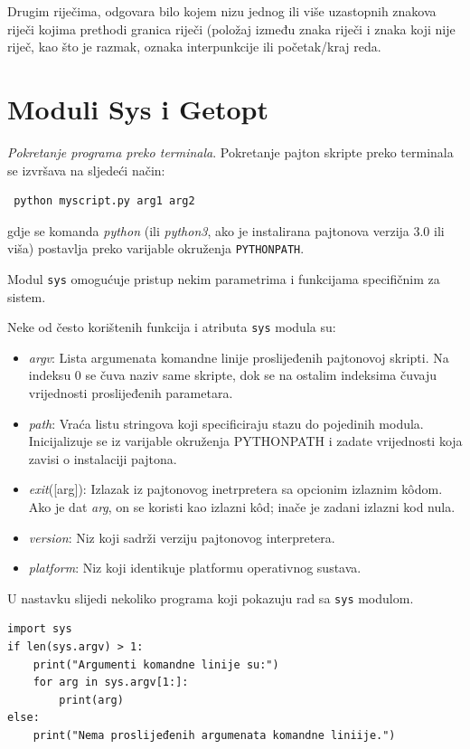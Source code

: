  Drugim riječima, odgovara bilo kojem nizu jednog ili više uzastopnih znakova riječi   kojima prethodi granica riječi (položaj između znaka riječi i znaka koji nije riječ, kao što je razmak, oznaka interpunkcije ili početak/kraj reda.
 
\section{Moduli Sys i Getopt}

\textit{Pokretanje programa preko terminala}. Pokretanje pajton skripte preko terminala se izvršava na sljedeći način:

\begin{verbatim}
 python myscript.py arg1 arg2
\end{verbatim}
gdje se komanda \emph{python} (ili \textit{python3},  ako je instalirana pajtonova verzija 3.0 ili viša) postavlja preko  varijable okruženja \texttt{PYTHONPATH}. 

 Modul \texttt{sys} omogućuje pristup nekim parametrima i funkcijama specifičnim za sistem. 

Neke od često korištenih funkcija i atributa \texttt{sys} modula su:

\begin{itemize}
	\item \textit{argv}: Lista argumenata komandne linije proslijeđenih pajtonovoj skripti. Na indeksu 0 se čuva naziv same skripte, dok se na ostalim indeksima čuvaju vrijednosti proslijeđenih parametara. 
     \item \textit{path}: Vraća listu stringova koji specificiraju stazu do pojedinih modula. Inicijalizuje se iz varijable okruženja PYTHONPATH i zadate vrijednosti koja zavisi o instalaciji pajtona.
     \item \textit{exit}([arg]): Izlazak iz pajtonovog inetrpretera sa opcionim izlaznim k\^odom. Ako je dat \textit{arg}, on se koristi kao izlazni k\^od; inače je zadani izlazni kod nula.
     \item \textit{version}: Niz koji sadrži verziju pajtonovog interpretera.
     \item \textit{platform}: Niz koji identikuje platformu operativnog sustava.
\end{itemize}

U nastavku slijedi nekoliko programa koji pokazuju rad sa \texttt{sys} modulom. 

\begin{verbatim}
import sys
if len(sys.argv) > 1:
    print("Argumenti komandne linije su:")
    for arg in sys.argv[1:]:
        print(arg)
else:
    print("Nema proslijeđenih argumenata komandne liniije.")
\end{verbatim}

